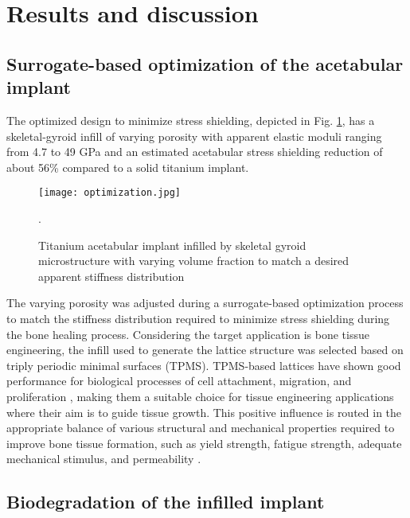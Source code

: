\section{Results and discussion}

\subsection{Surrogate-based optimization of the acetabular implant}

The optimized design to minimize stress shielding, depicted in Fig. \ref{fig:cup_optimization},  has a skeletal-gyroid infill of varying porosity with apparent elastic moduli ranging from 4.7 to 49 GPa and an estimated acetabular stress shielding reduction of about 56\% compared to a solid titanium implant.

\begin{figure}[h]
\centering
\medskip
\texttt{[image: optimization.jpg]}
\caption[Acetabular implant infilled by skeletal gyroid microstructure with varying volume fraction]{Titanium acetabular implant infilled by skeletal gyroid microstructure with varying volume fraction to match a desired apparent stiffness distribution  \cite{Perez-Boerema2022}}. \label{fig:cup_optimization}
\end{figure}

The varying porosity was adjusted during a surrogate-based optimization process to match the stiffness distribution required to minimize stress shielding during the bone healing process. Considering the target application is bone tissue engineering, the infill used to generate the lattice structure was selected based on triply periodic minimal surfaces ({TPMS}). {TPMS}-based lattices have shown good performance for biological processes of cell attachment, migration, and proliferation \cite{RAJAGOPALAN2006,Hede2021}, making them a suitable choice for tissue engineering applications where their aim is to guide tissue growth. This positive influence is routed in the appropriate balance of various structural and mechanical properties required to improve bone tissue formation, such as yield strength, fatigue strength, adequate mechanical stimulus, and permeability \cite{OtextquotesingleBrien2011,Hollister2005}.

\subsection{Biodegradation of the infilled implant}

